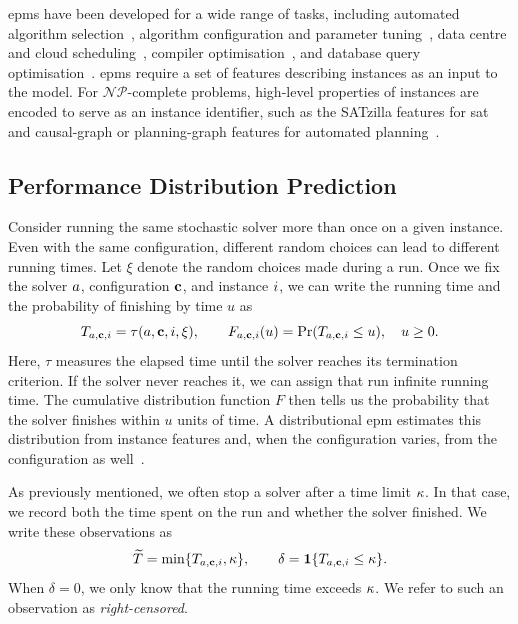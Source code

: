 \glspl{epm} have been developed for a wide range of tasks, including automated algorithm selection~\citep{XuEtAl08, Kotthoff16}, algorithm configuration and parameter tuning~\citep{HutEtAl12, HutEtAl06}, data centre and cloud scheduling~\citep{LeeEtAl25, IslEtAl12, SaxEtAl23, PhaEtAl20}, compiler optimisation~\citep{YotEtAl03, AshEtAl19}, and database query optimisation~\citep{WuEtAl13}. \glspl{epm} require a set of features describing instances as an input to the model. For $\mathcal{NP}$-complete problems, high-level properties of instances are encoded to serve as an instance identifier, such as the SATzilla features for \gls{sat}~\citep{HutEtAl14,ShaHoo24} and causal-graph or planning-graph features for automated planning~\citep{FawEtAl14}.

\subsection{Performance Distribution Prediction}
\label{sec:ch02:distribution_prediction}

Consider running the same stochastic solver more than once on a given instance. Even with the same configuration, different random choices can lead to different running times. Let $\xi$ denote the random choices made during a run. Once we fix the solver $a$, configuration $\mathbf{c}$, and instance $i$, we can write the running time and the probability of finishing by time $u$ as
\begin{equation*}
    T_{a,\mathbf{c},i}
    = \tau(a,\mathbf{c},i,\xi),
    \qquad
    F_{a,\mathbf{c},i}(u)
    = \Pr(T_{a,\mathbf{c},i}\leq u),
    \quad u\geq 0.
\end{equation*}
Here, $\tau$ measures the elapsed time until the solver reaches its termination criterion. If the solver never reaches it, we can assign that run infinite running time. The cumulative distribution function $F$ then tells us the probability that the solver finishes within $u$ units of time. A distributional \gls{epm} estimates this distribution from instance features and, when the configuration varies, from the configuration as well~\citep{EggEtAl18}.

As previously mentioned, we often stop a solver after a time limit $\kappa$. In that case, we record both the time spent on the run and whether the solver finished. We write these observations as
\begin{equation*}
    \widetilde T = \min\{T_{a,\mathbf{c},i},\kappa\},
    \qquad
    \delta = \mathbf 1\{T_{a,\mathbf{c},i}\leq\kappa\}.
\end{equation*}
When $\delta=0$, we only know that the running time exceeds $\kappa$. We refer to such an observation as \emph{right-censored}.

